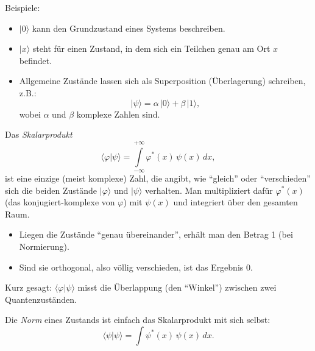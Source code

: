 		Beispiele:
		\begin{itemize}
		\item $|0\rangle$ kann den Grundzustand eines Systems beschreiben.
		\item $|x\rangle$ steht für einen Zustand, in dem sich ein Teilchen genau am Ort $x$ befindet.
		\item Allgemeine Zustände lassen sich als Superposition (Überlagerung) schreiben, z.B.:
		\[
			|\psi\rangle = \alpha\,|0\rangle + \beta\,|1\rangle,
		\]
		wobei $\alpha$ und $\beta$ komplexe Zahlen sind.
		\end{itemize}

		Das \emph{Skalarprodukt}
		\begin{equation}
		\langle \varphi | \psi \rangle = \int\limits_{-\infty}^{+\infty} \varphi^*(x)\,\psi(x)\,dx,
		\end{equation}
		ist eine einzige (meist komplexe) Zahl, die angibt, wie ``gleich'' oder ``verschieden'' sich die beiden Zustände $|\varphi\rangle$ und $|\psi\rangle$ verhalten.
		Man multipliziert dafür $\varphi^*(x)$ (das konjugiert-komplexe von $\varphi$) mit $\psi(x)$ und integriert über den gesamten Raum.
		\begin{itemize}
			\item Liegen die Zustände ``genau übereinander'', erhält man den Betrag 1 (bei Normierung).
			\item Sind sie orthogonal, also völlig verschieden, ist das Ergebnis 0.
		\end{itemize}
		Kurz gesagt:
		$\langle \varphi | \psi \rangle$ misst die Überlappung (den ``Winkel'') zwischen zwei Quantenzuständen.

		Die \emph{Norm} eines Zustands ist einfach das Skalarprodukt mit sich selbst:
		\begin{equation}
		\langle \psi | \psi \rangle = \int \psi^*(x)\,\psi(x)\,dx.
		\end{equation}

